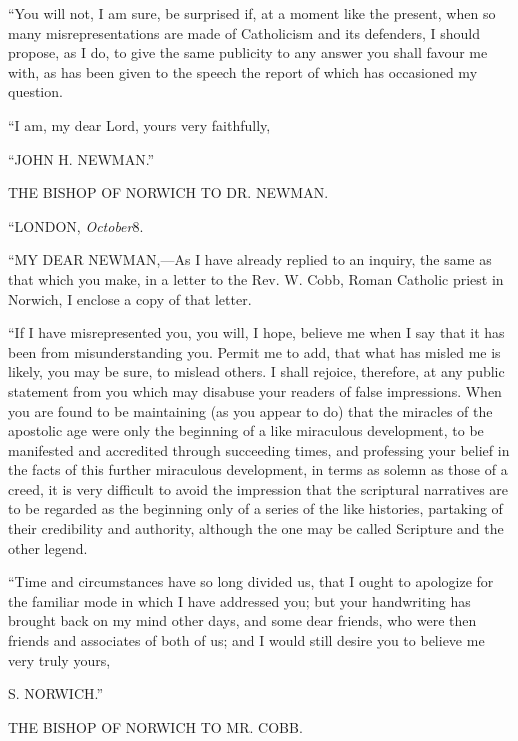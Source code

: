 ``You will not, I am sure, be surprised if, at a
moment like the present, when so many misrepresentations
are made of Catholicism and its defenders, I should
propose, as I do, to give the same publicity to any
answer you shall favour me with, as has been given to the
speech the report of which has occasioned my question.


``I am, my dear Lord, yours very faithfully,

``JOHN H. NEWMAN.''






THE BISHOP OF NORWICH TO DR. NEWMAN.

``LONDON, \emph{October}8.

``MY DEAR
NEWMAN,—As I have already replied
to an inquiry, the same as that which you make, in a
letter to the Rev. W. Cobb, Roman Catholic priest in
Norwich, I enclose a copy of that letter.


``If I have misrepresented you, you will, I hope,
believe me when I say that it has been from
misunderstanding you. Permit me to add, that what has
misled me is likely, you may be sure, to mislead others.
I shall rejoice, therefore, at any public statement from
you which may disabuse your readers of false impressions.
When you are found to be maintaining (as you appear to
do) that the miracles of the apostolic age were only the
beginning of a like miraculous development, to be
manifested and accredited through succeeding times, and
professing your belief in the facts of this further
miraculous development, in terms as solemn as those of a
creed, it is very difficult to avoid the impression that
the scriptural narratives are to be regarded as the
beginning only of a series of the like histories,
partaking of their credibility and authority, although
the one may be called Scripture and the other legend.


``Time and circumstances have so long divided us,
that I ought to apologize for the familiar mode in which
I have addressed you; but your handwriting has brought
back on my mind other days, and some dear friends, who
were then friends and associates of both of us; and I
would still desire you to believe me very truly yours,

S. NORWICH.''






THE BISHOP OF NORWICH TO MR. COBB.

